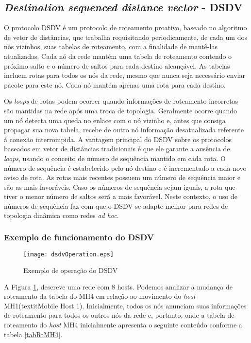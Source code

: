 \subsection{\textit{Destination sequenced distance vector} - DSDV} 
O protocolo DSDV \'e um protocolo de roteamento proativo\cite{gorantala}, baseado no algoritmo de vetor de dist\^ancias, que trabalha requisitando periodicamente, de cada um dos n\'os vizinhos, suas tabelas de roteamento, com a finalidade de mant\^e-las atualizadas. 
Cada n\'o da rede mant\'em uma tabela de roteamento contendo o pr\'oximo salto e o n\'umero de saltos para cada destino alcan\c{c}\'avel. 
As tabelas incluem rotas para todos os n\'os da rede, mesmo que nunca seja necess\'ario enviar pacote para este n\'o. 
Cada n\'o mant\'em apenas uma rota para cada destino.

Os \textit{loops} de rotas podem ocorrer quando informa\c{c}\~oes de roteamento incorretas s\~ao mantidas na rede ap\'os uma troca de topologia. 
Geralmente ocorre quando um n\'o detecta uma queda no enlace com o n\'o vizinho e, antes que consiga propagar sua nova tabela, recebe de outro n\'o informa\c{c}\~ao desatualizada referente \`a conex\~ao interrompida. 
A vantagem principal do DSDV sobre os protocolos baseados em vetor de dist\^ancias tradicionais \'e que ele garante a aus\^encia de \textit{loops}, usando o conceito de n\'umero de sequ\^encia mantido em cada rota. 
O n\'umero de sequ\^encia \'e estabelecido pelo n\'o destino e \'e incrementado a cada novo aviso de rota.
As rotas mais recentes possuem um n\'umero de sequ\^encia maior e s\~ao as mais favor\'aveis. 
Caso os n\'umeros de sequ\^encia sejam iguais, a rota que tiver o menor n\'umero de saltos ser\'a a mais favor\'avel. 
Neste contexto, o uso de n\'umeros de sequ\^encia faz com que o DSDV se adapte melhor para redes de topologia din\^amica como redes \textit{ad hoc}.

\subsubsection{Exemplo de funcionamento do DSDV}
\begin{figure}[H]
	\centering
	\texttt{[image: dsdvOperation.eps]}
	\caption{Exemplo de opera\c{c}\~ ao do DSDV}
	\label{figOpDSDV}
\end{figure}

A Figura \ref{figOpDSDV}, descreve uma rede com 8 hosts. 
Podemos analizar a mudan\c{c}a de roteamento da tabela do MH4 em rela\c{c}\~ao ao movimento do \textit{host} MH1(textit{Mobile Host 1}). 
Inicialmente, todos os n\'os anunciam suas informa\c{c}\~oes de roteamento para todos os outros n\'os da rede e, portanto, onde a tabela de roteamento do \textit{host} MH4 inicialmente apresenta o seguinte conte\'udo conforme a tabela \ref{tabRtMH4}.

